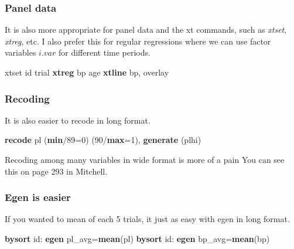 \documentclass[
]{book}
\newenvironment{Shaded}{\begin{snugshade}}{\end{snugshade}}
\newcommand{\FunctionTok}[1]{\textcolor[rgb]{0.13,0.29,0.53}{\textbf{#1}}}
\newcommand{\KeywordTok}[1]{\textcolor[rgb]{0.13,0.29,0.53}{\textbf{#1}}}
\newcommand{\NormalTok}[1]{#1}
\begin{document}
\subsubsection*{Panel data}\label{panel-data}

It is also more appropriate for panel data and the xt commands, such as \emph{xtset}, \emph{xtreg}, etc. I also prefer this for regular regressions where we can use factor variables \(i.var\) for different time periods.

\begin{Shaded}
\begin{Highlighting}[]
\NormalTok{xtset id trial}
\KeywordTok{xtreg}\NormalTok{ bp age}
\KeywordTok{xtline}\NormalTok{ bp, overlay}
\end{Highlighting}
\end{Shaded}

\subsubsection*{Recoding}\label{recoding}

It is also easier to recode in long format.

\begin{Shaded}
\begin{Highlighting}[]
\KeywordTok{recode}\NormalTok{ pl (}\FunctionTok{min}\NormalTok{/89=0) (90/}\FunctionTok{max}\NormalTok{=1), }\KeywordTok{generate}\NormalTok{ (plhi)}
\end{Highlighting}
\end{Shaded}

Recoding among many variables in wide format is more of a pain
You can see this on page 293 in Mitchell.

\subsubsection*{Egen is easier}\label{egen-is-easier}

If you wanted to mean of each 5 trials, it just as easy with egen in long format.

\begin{Shaded}
\begin{Highlighting}[]
\KeywordTok{bysort}\NormalTok{ id: }\KeywordTok{egen}\NormalTok{ pl\_avg=}\KeywordTok{mean}\NormalTok{(pl)}
\KeywordTok{bysort}\NormalTok{ id: }\KeywordTok{egen}\NormalTok{ bp\_avg=}\KeywordTok{mean}\NormalTok{(bp)}
\end{Highlighting}
\end{Shaded}
\end{document}
